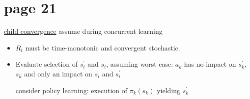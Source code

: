 \section*{page 21}

\underline{child convergence} assume during concurrent learning\\

\begin{itemize}
\item $R_t$ must be time-monotonic and convergent stochastic.\\
\item Evaluate selection of $s^\prime_i$ and $s_i$, assuming worst case: $a_k$ has no impact on $s^\prime_k$, $s_k$ and only an impact on $s_i$ and $s^\prime_i$\\
\begin{center}
\end{center}
consider policy learning: execution of $\pi_k(s_k)$ yielding $s^\prime_k$
\end{itemize}